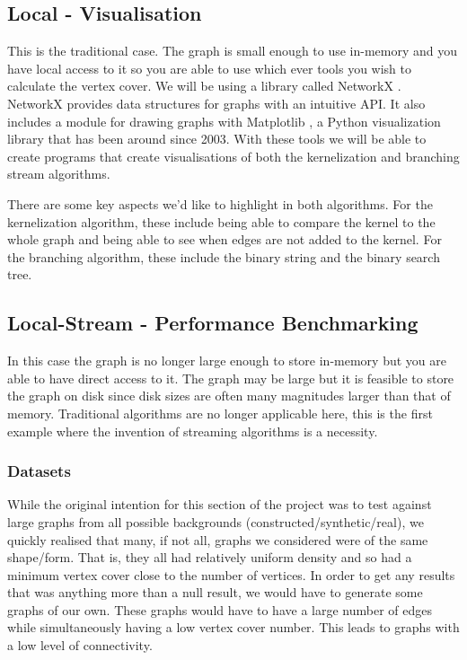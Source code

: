 \subsection{Local - Visualisation}

This is the traditional case. The graph is small enough to use in-memory
and you have local access to it so you are able to use which ever tools
you wish to calculate the vertex cover. We will be using a library
called NetworkX \cite{hagberg2008exploring}. NetworkX provides data structures
for graphs with an intuitive API. It also includes a module for drawing
graphs with Matplotlib \cite{hunter2007matplotlib}, a Python visualization
library that has been around since 2003. With these tools we will be
able to create programs that create visualisations of both the
kernelization and branching stream algorithms.

There are some key aspects we'd like to highlight in both algorithms.
For the kernelization algorithm, these include being able to compare the
kernel to the whole graph and being able to see when edges are not added
to the kernel. For the branching algorithm, these include the binary
string and the binary search tree.


\subsection{Local-Stream - Performance Benchmarking}

In this case the graph is no longer large enough to store in-memory but
you are able to have direct access to it. The graph may be large but it
is feasible to store the graph on disk since disk sizes are often many
magnitudes larger than that of memory. Traditional algorithms are no
longer applicable here, this is the first example where the invention of
streaming algorithms is a necessity.

\subsubsection{Datasets}

While the original intention for this section of the project was to test
against large graphs from all possible backgrounds
(constructed/synthetic/real), we quickly realised that many, if not all,
graphs we considered were of the same shape/form. That is, they all had
relatively uniform density and so had a minimum vertex cover close to
the number of vertices. In order to get any results that was anything
more than a null result, we would have to generate some graphs of our
own. These graphs would have to have a large number of edges while
simultaneously having a low vertex cover number. This leads to graphs
with a low level of connectivity.


